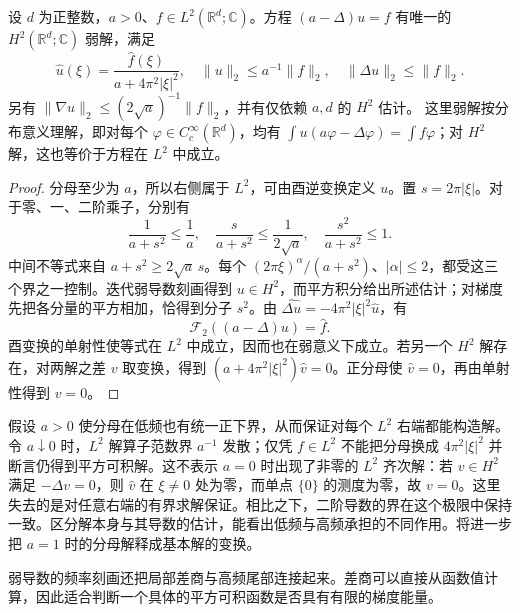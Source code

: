 \begin{proposition}[常系数预解方程]\label{b2:prop:04-resolvent-model}
设 \(d\) 为正整数，\(a>0\)、\(f\in L^2(\mathbb R^d;\mathbb C)\)。方程 \((a-\Delta)u=f\) 有唯一的 \(H^2(\mathbb R^d;\mathbb C)\) 弱解，满足
\[
 \widehat u(\xi)=\frac{\widehat f(\xi)}{a+4\pi^2|\xi|^2},
 \quad \|u\|_2\leq a^{-1}\|f\|_2,
 \quad \|\Delta u\|_2\leq\|f\|_2.
\]
另有 \(\|\nabla u\|_2\leq(2\sqrt a)^{-1}\|f\|_2\)，并有仅依赖 \(a,d\) 的 \(H^2\) 估计。
这里弱解按分布意义理解，即对每个 \(\varphi\in C_c^\infty(\mathbb R^d)\)，均有 \(\int u(a\varphi-\Delta\varphi)=\int f\varphi\)；对 \(H^2\) 解，这也等价于方程在 \(L^2\) 中成立。
\end{proposition}
\begin{proof}
分母至少为 \(a\)，所以右侧属于 \(L^2\)，可由酉逆变换定义 \(u\)。置 \(s=2\pi|\xi|\)。对于零、一、二阶乘子，分别有
\[
 \frac1{a+s^2}\leq\frac1a,
 \quad\frac{s}{a+s^2}\leq\frac1{2\sqrt a},
 \quad\frac{s^2}{a+s^2}\leq1.
\]
中间不等式来自 \(a+s^2\geq2\sqrt a\,s\)。每个 \((2\pi\xi)^\alpha/(a+s^2)\)、\(|\alpha|\leq2\)，都受这三个界之一控制。迭代弱导数刻画得到 \(u\in H^2\)，而平方积分给出所述估计；对梯度先把各分量的平方相加，恰得到分子 \(s^2\)。由 \(\widehat{\Delta u}=-4\pi^2|\xi|^2\widehat u\)，有
\[
 \mathcal F_2((a-\Delta)u)=\widehat f.
\]
酉变换的单射性使等式在 \(L^2\) 中成立，因而也在弱意义下成立。若另一个 \(H^2\) 解存在，对两解之差 \(v\) 取变换，得到 \((a+4\pi^2|\xi|^2)\widehat v=0\)。正分母使 \(\widehat v=0\)，再由单射性得到 \(v=0\)。
\end{proof}

假设 \(a>0\) 使分母在低频也有统一正下界，从而保证对每个 \(L^2\) 右端都能构造解。令 \(a\downarrow0\) 时，\(L^2\) 解算子范数界 \(a^{-1}\) 发散；仅凭 \(f\in L^2\) 不能把分母换成 \(4\pi^2|\xi|^2\) 并断言仍得到平方可积解。这不表示 \(a=0\) 时出现了非零的 \(L^2\) 齐次解：若 \(v\in H^2\) 满足 \(-\Delta v=0\)，则 \(\widehat v\) 在 \(\xi\ne0\) 处为零，而单点 \(\{0\}\) 的测度为零，故 \(v=0\)。这里失去的是对任意右端的有界求解保证。相比之下，二阶导数的界在这个极限中保持一致。区分解本身与其导数的估计，能看出低频与高频承担的不同作用。将进一步把 \(a=1\) 时的分母解释成基本解的变换。

\ProseParagraphBreak

弱导数的频率刻画还把局部差商与高频尾部连接起来。差商可以直接从函数值计算，因此适合判断一个具体的平方可积函数是否具有有限的梯度能量。

